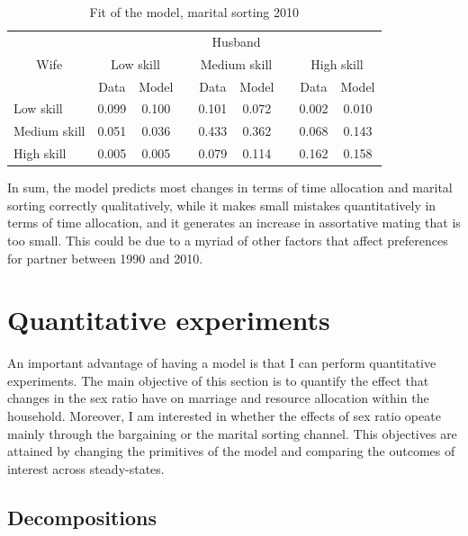 \documentclass[12pt]{article}
\begin{document}
\begin{table}[htbp]
	\centering
	\caption{Fit of the model, marital sorting 2010}
	\begin{tabular}{lcccccccc}
		\toprule
		\multicolumn{1}{c}{\multirow{3}[6]{*}{Wife}} & \multicolumn{8}{c}{Husband} \\
		\cmidrule{2-9}          & \multicolumn{2}{c}{Low skill} &       & \multicolumn{2}{c}{Medium skill} &       & \multicolumn{2}{c}{High skill} \\
		\cmidrule{2-3}\cmidrule{5-6}\cmidrule{8-9}          & Data  & Model &       & Data  & Model &       & Data  & Model \\
		\midrule
		Low skill & 0.099 & 0.100 &       & 0.101 & 0.072 &       & 0.002 & 0.010 \\
		Medium skill & 0.051 & 0.036 &       & 0.433 & 0.362 &       & 0.068 & 0.143 \\
		High skill & 0.005 & 0.005 &       & 0.079 & 0.114 &       & 0.162 & 0.158 \\
		\bottomrule
		\bottomrule
	\end{tabular}
	\label{tab:ms_results_2010}
\end{table}

In sum, the model predicts most changes in terms of time allocation and marital sorting correctly qualitatively, while it makes small mistakes quantitatively in terms of time allocation, and it generates an increase in assortative mating that is too small. This could be due to a myriad of other factors that affect preferences for partner between 1990 and 2010.
 
\section{Quantitative experiments} \label{sec:quant}

An important advantage of having a model is that I can perform quantitative experiments. The main objective of this section is to quantify the effect that changes in the sex ratio have on marriage and resource allocation within the household. Moreover, I am interested in whether the effects of sex ratio opeate mainly through the bargaining or the marital sorting channel. This objectives are attained by changing the primitives of the model and comparing the outcomes of interest across steady-states. 

\subsection{Decompositions}
\end{document}
